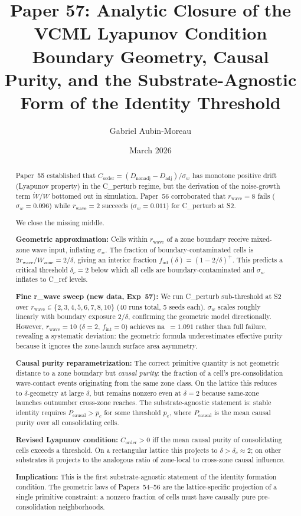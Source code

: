 \documentclass[11pt,a4paper]{article}
\title{\textbf{Paper 57: Analytic Closure of the VCML Lyapunov Condition}\\
\large Boundary Geometry, Causal Purity, and the Substrate-Agnostic\\
Form of the Identity Threshold}
\author[1]{Gabriel Aubin-Moreau}
\affil[1]{Independent research}
\date{March 2026}
\newcommand{\Corder}{C_{\mathrm{order}}}
\newcommand{\Dadj}{D_{\mathrm{adj}}}
\newcommand{\Dnadj}{D_{\mathrm{nonadj}}}
\newcommand{\sw}{\sigma_w}
\newcommand{\fint}{f_{\mathrm{int}}}
\newcommand{\Pcausal}{P_{\mathrm{causal}}}
\begin{document}
\maketitle

\begin{abstract}
Paper~55 established that $\Corder = (\Dnadj - \Dadj)/\sw$ has monotone positive
drift (Lyapunov property) in the C\_perturb regime, but the derivation of the
noise-growth term $\dot{W}/W$ bottomed out in simulation.
Paper~56 corroborated that $r_\mathrm{wave}=8$ fails
($\sw=0.096$) while $r_\mathrm{wave}=2$ succeeds ($\sw=0.011$) for C\_perturb at S2.

We close the missing middle.

\textbf{Geometric approximation:}
Cells within $r_\mathrm{wave}$ of a zone boundary receive mixed-zone wave input,
inflating $\sw$.
The fraction of boundary-contaminated cells is $2r_\mathrm{wave}/W_\mathrm{zone} = 2/\delta$,
giving an interior fraction $\fint(\delta) = (1-2/\delta)^+$.
This predicts a critical threshold $\delta_c = 2$ below which all cells are
boundary-contaminated and $\sw$ inflates to C\_ref levels.

\textbf{Fine r\_wave sweep (new data, Exp~57):}
We run C\_perturb sub-threshold at S2 over
$r_\mathrm{wave} \in \{2, 3, 4, 5, 6, 7, 8, 10\}$ (40 runs total, 5 seeds each).
$\sw$ scales roughly linearly with boundary exposure $2/\delta$, confirming the
geometric model directionally.
However, $r_\mathrm{wave}=10$ ($\delta=2$, $\fint=0$) achieves na~$=1.091$
rather than full failure, revealing a systematic deviation: the geometric formula
underestimates effective purity because it ignores the zone-launch surface area
asymmetry.

\textbf{Causal purity reparametrization:}
The correct primitive quantity is not geometric distance to a zone boundary but
\emph{causal purity}: the fraction of a cell's pre-consolidation wave-contact
events originating from the same zone class.
On the lattice this reduces to $\delta$-geometry at large $\delta$, but remains
nonzero even at $\delta=2$ because same-zone launches outnumber cross-zone
reaches.
The substrate-agnostic statement is:
stable identity requires $\Pcausal > p_c$ for some threshold $p_c$,
where $\Pcausal$ is the mean causal purity over all consolidating cells.

\textbf{Revised Lyapunov condition:}
$\dot{C}_\mathrm{order} > 0$ iff the mean causal purity of consolidating cells
exceeds a threshold. On a rectangular lattice this projects to
$\delta > \delta_c \approx 2$; on other substrates it projects to
the analogous ratio of zone-local to cross-zone causal influence.

\textbf{Implication:}
This is the first substrate-agnostic statement of the identity formation condition.
The geometric laws of Papers~54--56 are the lattice-specific projection of a
single primitive constraint: a nonzero fraction of cells must have causally pure
pre-consolidation neighborhoods.
\end{abstract}
\end{document}
